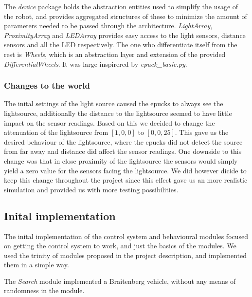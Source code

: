 \documentclass[12pt]{article}
\newcommand{\shiftline}[0]{\hfill\newline\noindent}
\begin{document}
			\shiftline The \textit{device} package holds the abstraction entities used to simplify the usage of the robot, 
				and provides aggregated structures of these to minimize the amount of parameters needed to be passed through the architecture. 
				\textit{LightArray}, \textit{ProximityArray} and \textit{LEDArray} provides easy access to the light sensors, distance sensors and all the LED respectively. 
				The one who differentiate itself from the rest is \textit{Wheels}, which is an abstraction layer and extension of the provided \textit{DifferentialWheels}. 
				It was large inspirered by \textit{epuck\_basic.py}.
			
		\subsubsection{Changes to the world}
			The inital settings of the light source caused the epucks to always see the lightsource, additionally the distance to the lightsource seemed
			to have little impact on the sensor readings. Based on this we decided to change the attenuation of the lightsource from $[1,0,0]$ to $[0,0,25]$.
			This gave us the desired behaviour of the lightsource, where the epucks did not detect the source from far away and distance did affect the sensor readings.
			One downside to this change was that in close proximity of the lightsource the sensors would simply yield a zero value for the sensors facing the lightsource.
			We did however dicide to keep this change throughout the project since this effect gave us an more realistic simulation and provided us with more testing possibilities.
			
		
	\subsection{Inital implementation}
		The inital implementation of the control system and behavioural modules focused on getting the control system to work, and just the basics of the modules.
		We used the trinity of modules proposed in the project description, and implemented them in a simple way. 
		
		\shiftline The \textit{Search} module implemented a Braitenberg vehicle, without any means of randomness in the module. 
		
\end{document}
